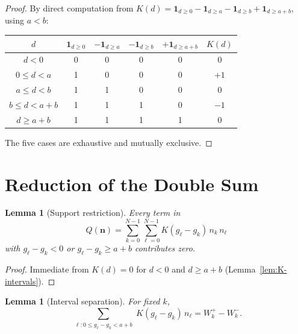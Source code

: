 \documentclass[11pt,a4paper]{amsart}
\theoremstyle{plain}
\newtheorem{lemma}[theorem]{Lemma}
\theoremstyle{definition}
\theoremstyle{remark}
\begin{document}
\begin{proof}
By direct computation from
$K(d) = \mathbf{1}_{d \geq 0} - \mathbf{1}_{d \geq a} - \mathbf{1}_{d \geq b}
       + \mathbf{1}_{d \geq a+b}$,
using $a < b$:

\medskip
\begin{center}
\begin{tabular}{c|cccc|c}
$d$ & $\mathbf{1}_{d\geq 0}$ & $-\mathbf{1}_{d\geq a}$ &
      $-\mathbf{1}_{d\geq b}$ & $+\mathbf{1}_{d\geq a+b}$ & $K(d)$ \\
\hline
$d < 0$          & 0 & 0 & 0 & 0 & $0$  \\
$0 \leq d < a$   & 1 & 0 & 0 & 0 & $+1$ \\
$a \leq d < b$   & 1 & 1 & 0 & 0 & $0$  \\
$b \leq d < a+b$ & 1 & 1 & 1 & 0 & $-1$ \\
$d \geq a+b$     & 1 & 1 & 1 & 1 & $0$  \\
\end{tabular}
\end{center}
The five cases are exhaustive and mutually exclusive.
\end{proof}

\section{Reduction of the Double Sum}
\label{sec:reduction}

\begin{lemma}[Support restriction]
\label{lem:support}
Every term in
\begin{equation}
\label{eq:Q-double}
  Q(\mathbf{n}) = \sum_{k=0}^{N-1} \sum_{\ell=0}^{N-1}
    K(g_\ell - g_k)\, n_k\, n_\ell
\end{equation}
with $g_\ell - g_k < 0$ or $g_\ell - g_k \geq a+b$ contributes zero.
\end{lemma}

\begin{proof}
Immediate from $K(d) = 0$ for $d < 0$ and $d \geq a+b$
(Lemma~\ref{lem:K-intervals}).
\end{proof}

\begin{lemma}[Interval separation]
\label{lem:separation}
For fixed $k$,
\[
  \sum_{\substack{\ell : 0 \leq g_\ell - g_k < a+b}}
    K(g_\ell - g_k)\, n_\ell
  = W^+_k - W^-_k.
\]
\end{lemma}
\end{document}
